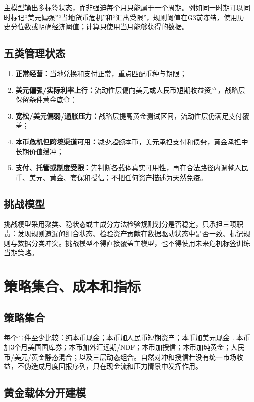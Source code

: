 \documentclass[UTF8,fontset=windows,12pt,openany]{ctexbook}
\begin{document}
主模型输出多标签状态，而非强迫每个月只能属于一个周期。例如同一时期可以同时标记“美元偏强”“当地货币危机”和“汇出受限”。规则阈值在G3前冻结，使用历史分位数或明确经济阈值；计算只使用当月能够获得的数据。

\section{五类管理状态}

\begin{enumerate}
  \item \textbf{正常经营：}当地兑换和支付正常，重点匹配币种与期限；
  \item \textbf{美元偏强/实际利率上行：}流动性层偏向美元或人民币短期收益资产，战略层保留条件黄金底仓；
  \item \textbf{宽松/美元偏弱/通胀压力：}战略层提高黄金测试区间，流动性层仍满足支付覆盖；
  \item \textbf{本币危机但跨境渠道可用：}减少超额本币，美元承担支付和债务，黄金承担中长期价值缓冲；
  \item \textbf{支付、托管或制度受限：}先判断各载体真实可用性，再在合法路径内调整人民币、美元、黄金、套保和授信；不把任何资产描述为天然免疫。
\end{enumerate}

\section{挑战模型}

挑战模型采用聚类、隐状态或主成分方法检验规则划分是否稳定，只承担三项职责：发现规则遗漏的组合状态、检验资产贡献在数据驱动状态中是否一致、标记规则与数据分类冲突。挑战模型不得直接覆盖主模型，也不得使用未来危机标签训练当期策略。

\chapter{策略集合、成本和指标}

\section{策略集合}

每个事件至少比较：纯本币现金；本币加人民币短期资产；本币加美元现金；本币加3个月美国国库券；本币加外汇远期/NDF；本币加授信；本币加纯黄金；人民币/美元/黄金静态混合；以及三层动态组合。自然对冲和授信若没有统一市场收益，不伪造成月度回报序列，只在现金流和压力情景中发挥作用。

\section{黄金载体分开建模}
\end{document}
